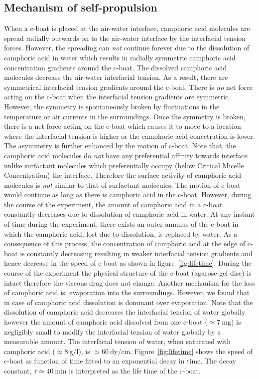 \documentclass[aps, twocolumn, floatfix, superscriptaddress]{revtex4}
\begin{document}
\subsection{Mechanism of self-propulsion}\label{sec:propmech}
When a c-boat is placed at the air-water interface, camphoric acid molecules are spread radially outwards on to the air-water interface by the interfacial tension forces. However, the spreading can \emph{not} continue forever due to the dissolution of camphoric acid in water which results in radially symmetric camphoric acid concentration gradients around the c-boat. The dissolved camphoric acid molecules decrease the air-water interfacial tension. As a result, there are symmetrical interfacial tension gradients around the c-boat. There is \emph{no} net force acting on the c-boat when the interfacial tension gradients are symmetric. However, the symmetry is spontaneously broken by fluctuations in the temperature or air currents in the surroundings. Once the symmetry is broken, there is a net force acting on the c-boat which causes it to move to a location where the interfacial tension is higher or the camphoric acid concetration is lower. The asymmetry is further enhanced by the motion of c-boat. Note that, the camphoric acid molecules do \emph{not} have any preferential affinity towards interface unlike surfactant molecules which preferentially occupy (below Critical Micelle Concentration) the interface. Therefore the surface activity of camphoric acid molecules is \emph{not} similar to that of surfactant molecules. The motion of c-boat would continue as long as there is camphoric acid in the c-boat. However, during the course of the experiment, the amount of camphoric acid in a c-boat constantly decreases due to dissolution of camphoric acid in water. At any instant of time during the experiment, there exists an outer annulus of the c-boat in which the camphoric acid, lost due to dissolution, is replaced by water. As a consequence of this process, the concentration of camphoric acid at the edge of c-boat is constantly decreasing resulting in weaker interfacial tension gradients and hence decrease in the speed of c-boat as shown in figure~\ref{fig:lifetime}. During the course of the experiment the physical structure of the c-boat (agarose-gel-disc) is intact therefore the viscous drag does not change. Another mechanism for the loss of camphoric acid is: evaporation into the surroundings. However, we found that in case of camphoric acid dissolution is dominant over evaporation. Note that the dissolution of camphoric acid decreases the interfacial tension of water globally however the amount of camphoric acid dissolved from one c-boat ($\simeq 7\ \mathrm{mg}$) is negligibly small to modify the interfacial tension of water globally by a measurable amount. The interfacial tension of water, when saturated with camphoric acid ($\simeq 8\ \mathrm{g/l}$), is $\simeq 60\ \mathrm{dy/cm}$. Figure~\ref{fig:lifetime} shows the speed of c-boat as function of time fitted to an exponential decay in time. The decay constant, $\tau \simeq 40\ \mathrm{min}$ is interpreted as the life time of the c-boat. \par
\end{document}
